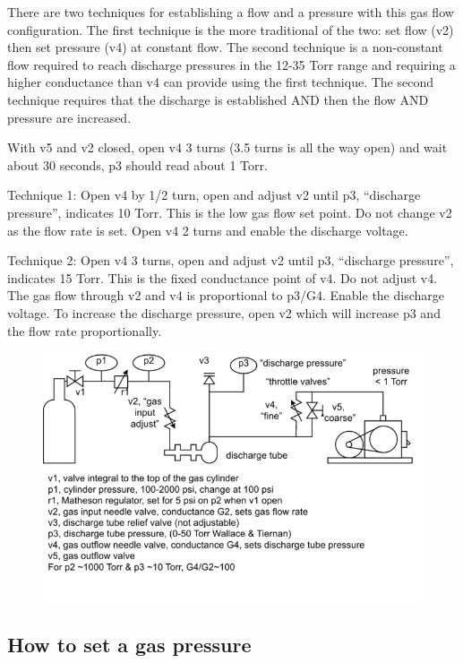 \documentclass{../lab}
\begin{document}
There are two techniques for establishing a flow and a pressure with this gas flow configuration. The first technique is the more traditional of the two: set flow (v2) then set pressure (v4) at constant flow. The second technique is a non-constant flow required to reach discharge pressures in the 12-35 Torr range and requiring a higher conductance than v4 can provide using the first technique. The second technique requires that the discharge is established AND then the flow AND pressure are increased.

With v5 and v2 closed, open v4 3 turns (3.5 turns is all the way open) and wait about 30 seconds, p3 should read about 1 Torr.

Technique 1: Open v4 by 1/2 turn, open and adjust v2 until p3, ``discharge pressure'', indicates 10 Torr. This is the low gas flow set point. Do not change v2 as the flow rate is set. Open v4 2 turns and enable the discharge voltage.

Technique 2: Open v4 3 turns, open and adjust v2 until p3, ``discharge pressure'', indicates 15 Torr. This is the fixed conductance point of v4. Do not adjust v4. The gas flow through v2 and v4 is proportional to p3/G4. Enable the discharge voltage. To increase the discharge pressure, open v2 which will increase p3 and the flow rate proportionally.

\begin{figure}[h]
    \centering
    \href{http://experimentationlab.berkeley.edu/sites/default/files/images/680px-Hall_diagram.png}{\includegraphics[width=0.8\linewidth]{images/680px-Hall_diagram.png}}
    \label{fig:680px-Hall_diagram}
\end{figure}

\subsection{How to set a gas pressure}
\end{document}
